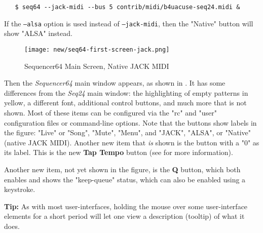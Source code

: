 \documentclass[
 11pt,
 twoside,
 a4paper,
 headinclude,
 footinclude,
 final                                 %
]{article}
\begin{document}

\begin{verbatim}
   $ seq64 --jack-midi --bus 5 contrib/midi/b4uacuse-seq24.midi &
\end{verbatim}

   If the \texttt{--alsa} option is used instead of
   \texttt{--jack-midi}, then the "Native" button will show "ALSA" instead.

\begin{figure}[H]
   \centering 
   \texttt{[image: new/seq64-first-screen-jack.png]}
   \caption{Sequencer64 Main Screen, Native JACK MIDI}
   \label{fig:seq64_main_screen}
\end{figure}

   Then the \textsl{Sequencer64} main window appears, as shown in
   .  It has some differences
   from the \textsl{Seq24} main window: the highlighting of
   empty patterns in yellow, a different font, additional control buttons,
   and much more that is not shown.
   Most of these items can be configured via the "rc" and "user" configuration
   files or command-line options.
   Note that the buttons show labels in the figure:
   "Live" or "Song", "Mute", "Menu", and "JACK", "ALSA", or "Native" (native
   JACK MIDI).
   Another new item that \textsl{is} shown is the button with a "0" as its
   label.  This is the new \textbf{Tap Tempo} button (see
    for more information).

   Another new item, not yet shown in the figure, is the \textbf{Q} button,
   which both enables and shows the "keep-queue" status, which can also be
   enabled using a keystroke.


   \textbf{Tip:}
   As with most user-interfaces, holding the mouse over some user-interface
   elements for a short period will let one view a description (tooltip)
   of what it does.


\rhead{\rightmark}         %
\end{document}
